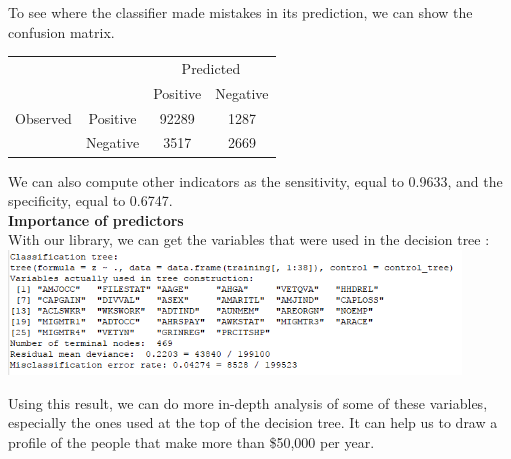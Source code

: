 \documentclass{article}
\begin{document}
\noindent To see where the classifier made mistakes in its prediction, we can show the confusion matrix.\\

\begin{tabular}{cc|c|c}
\multicolumn{2}{c|}{}& \multicolumn{2}{c}{Predicted} \\
\multicolumn{2}{c|}{} & Positive &	Negative\\
\hline
Observed &	Positive &	92289 & 1287\\
\cline{2-4} 
& Negative & 3517 & 2669
\end{tabular}

\vspace{0.5cm}
\noindent We can also compute other indicators as the sensitivity, equal to 0.9633, and the specificity, equal to 0.6747.  \\

\noindent\textbf{Importance of predictors} \\

\noindent With our library, we can get the variables that were used in the decision tree :\\

\includegraphics[width = 12cm]{tree_summary.png}

\vspace{0.7cm}

\noindent Using this result, we can do more in-depth analysis of some of these variables, especially the ones used at the top of the decision tree. It can help us to draw a profile of the people that make more than \$50,000 per year.\\
\end{document}
